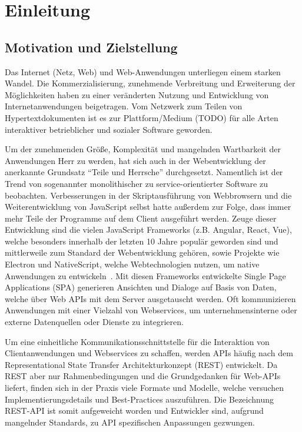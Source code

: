 \chapter{Einleitung}

\section{Motivation und Zielstellung}
Das Internet (Netz, Web) und Web-Anwendungen unterliegen einem starken Wandel.
Die Kommerzialisierung, zunehmende Verbreitung und Erweiterung der Möglichkeiten haben zu einer veränderten Nutzung und Entwicklung von Internetanwendungen beigetragen.
Vom Netzwerk zum Teilen von Hypertextdokumenten ist es zur Plattform/Medium (TODO) für alle Arten interaktiver betrieblicher und sozialer Software geworden.
\par
Um der zunehmenden Größe, Komplexität und mangelnden Wartbarkeit der Anwendungen Herr zu werden, hat sich auch in der Webentwicklung der anerkannte Grundsatz \enquote{Teile und Herrsche} durchgesetzt.
Namentlich ist der Trend von sogenannter monolithischer zu service-orientierter Software zu beobachten.
Verbesserungen in der Skriptausführung von Webbrowsern und die Weiterentwicklung von JavaScript selbst hatte außerdem zur Folge, dass immer mehr Teile der Programme auf dem Client ausgeführt werden.
Zeuge dieser Entwicklung sind die vielen JavaScript Frameworks (z.B. Angular, React, Vue), welche besonders innerhalb der letzten 10 Jahre populär geworden sind und mittlerweile zum Standard der Webentwicklung gehören, sowie Projekte wie Electron und NativeScript, welche Webtechnologien nutzen, um native Anwendungen zu entwickeln~\cite[vgl.][]{SOsurvey}.
Mit diesen Frameworks entwickelte Single Page Applications (SPA) generieren Ansichten und Dialoge auf Basis von Daten, welche über Web APIs mit dem Server ausgetauscht werden.
Oft kommunizieren Anwendungen mit einer Vielzahl von Webservices, \zB{} um unternehmensinterne oder externe Datenquellen oder Dienste zu integrieren.
\par
Um eine einheitliche Kommunikationsschnittstelle für die Interaktion von Clientanwendungen und Webservices zu schaffen, werden APIs häufig nach dem Representational State Transfer Architekturkonzept (REST) entwickelt.
Da REST aber nur Rahmenbedingungen und die Grundgedanken für Web-APIs liefert, finden sich in der Praxis viele Formate und Modelle, welche versuchen Implementierungsdetails und Best-Practices auszuführen.
Die Bezeichnung REST-API ist somit aufgeweicht worden und Entwickler sind, aufgrund mangelnder Standards, zu API spezifischen Anpassungen gezwungen.
